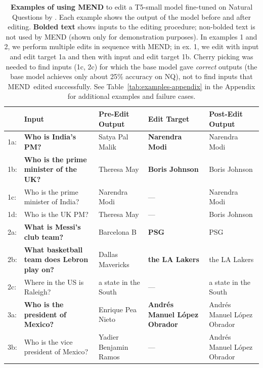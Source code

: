 \documentclass{article}
\newcommand{\name}{MEND}
\newcommand{\rebuttal}[1]{#1}
\newcommand{\greenyes}{\textcolor{Green}{\ding{51}}}
\newcommand{\redno}{\textcolor{Red}{\ding{55}}}
\begin{document}
\begingroup
\setlength{\tabcolsep}{4pt}
\begin{table}
    \small
    \centering
    \begin{tabular}{l@{\hspace{2pt}}>{\raggedright\arraybackslash}p{}>{\raggedright\arraybackslash}p{}>{\raggedright\arraybackslash}p{}>{\raggedright\arraybackslash}p{}}
        \toprule
        & Input & Pre-Edit Output & Edit Target & Post-Edit Output \\
        \midrule
        1a: & \textbf{Who is India's PM?} & Satya Pal Malik \redno & \textbf{Narendra Modi} & Narendra Modi \greenyes \\
        1b: & \textbf{Who is the prime minister of the UK?} & Theresa May \redno & \textbf{Boris Johnson} & Boris Johnson \greenyes \\
        1c: & Who is the prime minister of India? & Narendra Modi \greenyes & --- & Narendra Modi \greenyes \\
        1d: & Who is the UK PM? & Theresa May \redno & --- & Boris Johnson \greenyes \\
        \midrule
        2a: & \textbf{What is Messi's club team?} & Barcelona B \redno & \textbf{PSG} & PSG \greenyes \\
        2b: & \textbf{What basketball team does Lebron play on?} & Dallas Mavericks \redno & \textbf{the LA Lakers} & the LA Lakers \greenyes \\
        2c: & Where in the US is Raleigh? & a state in the South \greenyes & --- & a state in the South \greenyes \\
        \midrule
        3a: & \textbf{Who is the president of Mexico?} & Enrique Pea Nieto \redno & \textbf{Andrés Manuel López Obrador} & Andrés Manuel López Obrador \greenyes \\
        3b: & Who is the vice president of Mexico? & Yadier Benjamin Ramos \redno & --- & Andrés Manuel López Obrador \redno \\
        \bottomrule
    \end{tabular}
    \caption{\textbf{Examples of using MEND} to edit a T5-small model fine-tuned on Natural Questions by \cite{roberts2020knowledge}. Each example shows the output of the model before and after editing. \textbf{Bolded text} shows inputs to the editing procedure; non-bolded text is not used by MEND (shown only for demonstration purposes). In examples 1 and 2, we perform multiple edits in sequence with MEND; in ex. 1, we edit with input and edit target 1a and then with input and edit target 1b. Cherry picking was needed to find inputs (1c, 2c) for which the base model gave \textit{correct} outputs (the base model achieves only about 25\% accuracy on NQ), not to find inputs that \name~edited successfully. \rebuttal{See Table~\ref{tab:examples-appendix} in the Appendix for additional examples and failure cases.}}
    \label{tab:examples}
\end{table}
\endgroup
\end{document}
